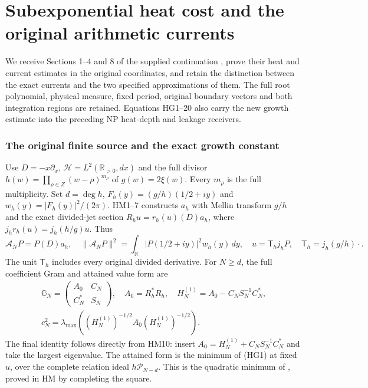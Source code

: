 
\clearpage

\begingroup
\providecommand{\C}{\mathbb C}\providecommand{\R}{\mathbb R}
\providecommand{\norm}[1]{\left\lVert#1\right\rVert}
\newtheorem{hgtheorem}{Theorem}
\newtheorem{hgproposition}{Proposition}
\newtheorem{hglemma}{Lemma}
\part*{Subexponential heat cost and the original arithmetic currents}
We receive Sections 1--4 and 8 of the supplied continuation
\cite{hg:web}, prove their heat and current estimates in the original
coordinates, and retain the distinction between the exact currents and
the two specified approximations of them. The full root polynomial,
physical measure, fixed period, original boundary vectors and both
integration regions are retained. Equations HG1--20 also carry the new
growth estimate into the preceding NP heat-depth and leakage receivers.

\section{The original finite source and the exact growth constant}
Use $D=-x\partial_x$, $\mathcal H=L^2(\R_{>0},dx)$ and the full divisor
$h(w)=\prod_{\rho\in Z}(w-\rho)^{m_\rho}$ of $g(w)=2\xi(w)$.
Every $m_\rho$ is the full multiplicity. Set $d=\deg h$,
$F_h(y)=(g/h)(1/2+iy)$ and $w_h(y)=|F_h(y)|^2/(2\pi)$.
HM1--7 \cite{hg:HM} constructs $a_h$ with Mellin transform $g/h$ and
the exact divided-jet section $R_hu=r_h(u)(D)a_h$, where
$j_hr_h(u)=j_h(h/g)u$. Thus
\[
 \mathcal A_NP=P(D)a_h,\quad
 \|\mathcal A_NP\|^2=\int_\R|P(1/2+iy)|^2w_h(y)\,dy,
 \quad u=\mathsf T_hj_hP,\quad \mathsf T_h=j_h(g/h)\cdot .\tag{HG1}
\]
The unit $\mathsf T_h$ includes every original divided derivative.
For $N\ge d$, the full coefficient Gram and attained value form are
\[
\begin{gathered}
 \mathbb G_N=\begin{pmatrix}A_0&C_N\\C_N^*&S_N\end{pmatrix},\quad
 A_0=R_h^*R_h,\quad H_N^{(1)}=A_0-C_NS_N^{-1}C_N^*,
 \\
 c_N^2=\lambda_{\max}((H_N^{(1)})^{-1/2}A_0(H_N^{(1)})^{-1/2}).
\end{gathered}
 \tag{HG2}
\]
The final identity follows directly from HM10: insert
$A_0=H_N^{(1)}+C_NS_N^{-1}C_N^*$ and take the largest eigenvalue.
The attained form is the minimum of (HG1) at fixed $u$, over the complete
relation ideal $h\mathcal P_{N-d}$. This is the quadratic minimum of
\cite[Appendix C.4.1]{hg:Boyd}, proved in HM by completing the square.

